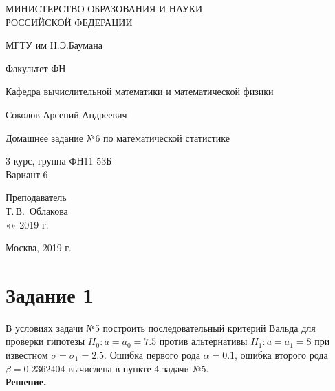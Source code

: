 \documentclass[14pt,a4paper]{scrartcl}
\begin{document}
	\begin{titlepage}
	\begin{center}
		\large
		МИНИСТЕРСТВО ОБРАЗОВАНИЯ И НАУКИ\\ РОССИЙСКОЙ ФЕДЕРАЦИИ
		
		\vspace{0.5cm}
		
		МГТУ им Н.Э.Баумана
		\vspace{0.25cm}
		
		Факультет ФН
		
		Кафедра вычислительной математики и математической физики
		\vfill
		
		
		Соколов Арсений Андреевич\\
		\vfill
		
		
		{\LARGE Домашнее задание №6 по математической статистике\\[2mm]
		}
		\bigskip
		
		3 курс, группа ФН11-53Б\\
		Вариант 6
	\end{center}
	\vfill
	
	\newlength{\ML}
	\hfill\begin{minipage}{0.4\textwidth}
		Преподаватель\\
		\underline{\hspace{3cm}} Т.\,В.~Облакова\\
		«\underline{\hspace{0.7cm}}» \underline{\hspace{1.71cm}} 2019 г.
	\end{minipage}%
	\bigskip
	
	
	\vfill
	
	\begin{center}
		Москва, 2019 г.
	\end{center}
\end{titlepage}

\section*{Задание 1}\label{sec1}
В условиях задачи №5 	построить последовательный критерий Вальда для проверки гипотезы $H_0: a=a_0=7.5$  против альтернативы $H_1:a=a_1=8$ при известном $\sigma=\sigma_1=2.5$. Ошибка первого рода $\alpha = 0.1$, ошибка второго рода $\beta = 0.2362404$ вычислена в пункте 4 задачи №5.\\
\textbf{Решение.}\\
\end{document}
